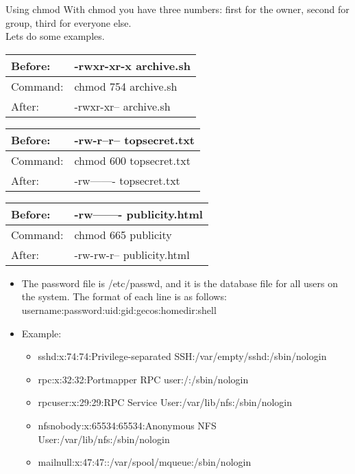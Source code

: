 \documentclass{beamer}
\begin{document}
\begin{frame}{Using chmod}
With chmod you have three numbers: first for the owner, second for group, third for everyone else.\\
Lets do some examples.\\
\begin{tabular}{| l | l |}
\hline
Before: & -rwxr-xr-x  archive.sh \\ \hline
Command: & chmod 754 archive.sh \\ \hline
After: & -rwxr-xr-- archive.sh \\
\hline
\end{tabular}
\begin{tabular}{| l | l |}
\hline
Before: & -rw-r--r-- topsecret.txt \\ \hline
Command: & chmod 600 topsecret.txt \\ \hline
After: & -rw------- topsecret.txt \\
\hline
\end{tabular}
\begin{tabular}{| l | l |}
\hline
Before: & -rw-------  publicity.html  \\ \hline
Command: & chmod 665 publicity \\ \hline
After: & -rw-rw-r--  publicity.html \\
\hline
\end{tabular}
\end{frame}

\begin{frame}{}
\begin{itemize}
\item The password file is /etc/passwd, and it is the database file for all users on the system. The format of each line is as follows:\\
username:password:uid:gid:gecos:homedir:shell\\
\item Example:
\begin{itemize}
\item sshd:x:74:74:Privilege-separated SSH:/var/empty/sshd:/sbin/nologin
\item rpc:x:32:32:Portmapper RPC user:/:/sbin/nologin
\item rpcuser:x:29:29:RPC Service User:/var/lib/nfs:/sbin/nologin
\item nfsnobody:x:65534:65534:Anonymous NFS User:/var/lib/nfs:/sbin/nologin
\item mailnull:x:47:47::/var/spool/mqueue:/sbin/nologin
\end{itemize}
\end{itemize}
\end{frame}
\end{document}
